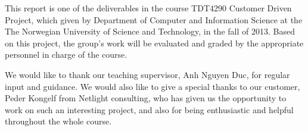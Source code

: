 This report is one of the deliverables in the course TDT4290 Customer Driven Project, which given by Department of Computer and Information Science at the The Norwegian University of Science and Technology, in the fall of 2013. Based on this project, the group's work will be evaluated and graded by the appropriate personnel in charge of the course. 

We would like to thank our teaching supervisor, Anh Nguyen Duc, for regular input and guidance. 
We would also like to give a special thanks to our customer, Peder  Kongelf from  Netlight consulting, who has given us the opportunity to work on such an interesting project, and also for being enthusiastic and helpful throughout the whole course.